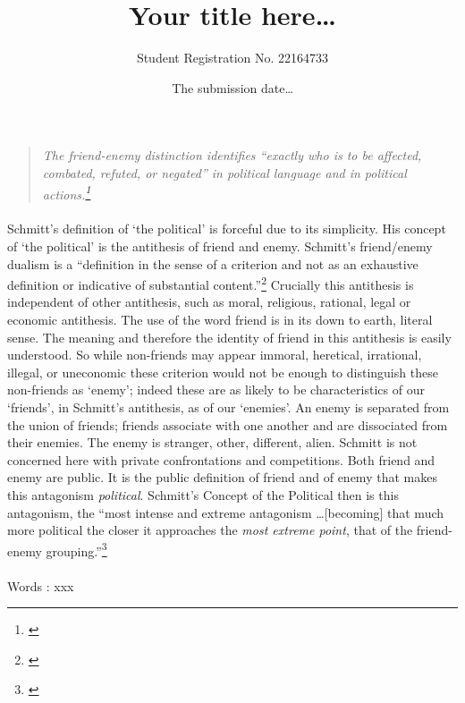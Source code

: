 \documentclass[12pt,a4paper,titlepage]{article}
\title{Your title here\ldots}
\author{Student Registration No. 22164733}
\date{The submission date\ldots}
\begin{document}

\maketitle
\doublespacing
\begin{quote}
\textit{The friend-enemy distinction identifies ``exactly who is to be affected, combated, refuted, or negated'' in political language and in political actions.\footnote{\cite[p.31]{schmitt:2007cop}}}
\end{quote}

\paragraph{}Schmitt's definition of `the political' is forceful due to its simplicity. His concept of `the political' is the antithesis of friend and enemy. Schmitt's friend/enemy dualism is a ``definition in the sense of a criterion and not as an exhaustive definition or indicative of substantial content.''\footnote{\cite[p.26]{schmitt:2007cop}} Crucially this antithesis is independent of other antithesis, such as moral, religious, rational, legal or economic antithesis. The use of the word friend is in its down to earth, literal sense. The meaning and therefore the identity of friend in this antithesis is easily understood. So while non-friends may appear immoral, heretical, irrational, illegal, or uneconomic these criterion would not be enough to distinguish these non-friends as `enemy'; indeed these are as likely to be characteristics of our `friends', in Schmitt's antithesis, as of our `enemies'. An enemy is separated from the union of friends; friends associate with one another and are dissociated from their enemies. The enemy is stranger, other, different, alien. Schmitt is not concerned here with private confrontations and competitions. Both friend and enemy are public. It is the public definition of friend and of enemy that makes this antagonism \emph{political}. Schmitt's Concept of the Political then is this antagonism, the ``most intense and extreme antagonism \ldots [becoming] that much more political the closer it approaches the \emph{most extreme point}, that of the friend-enemy grouping.''\footnote{\cite[p.29, emphasis added]{schmitt:2007cop}}
\newpage
\singlespacing

\medskip
\paragraph{}Words : xxx
\end{document}
